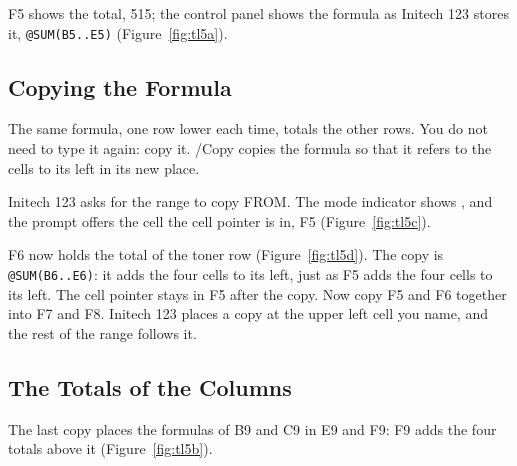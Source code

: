 \begin{Keystrokes}
\end{Keystrokes}
F5 shows the total, 515; the control panel shows the formula as Initech
123 stores it, \texttt{@SUM(B5..E5)} (Figure~\ref{fig:tl5a}).

\subsection{Copying the Formula}
The same formula, one row lower each time, totals the other rows.  You do
not need to type it again: copy it.  /Copy copies the formula so that it
refers to the cells to its left in its new place.

\begin{Keystrokes}
\end{Keystrokes}
Initech 123 asks for the range to copy FROM.  The mode indicator shows
, and the prompt offers the cell the cell pointer is in, F5
(Figure~\ref{fig:tl5c}).
\begin{Keystrokes}
\end{Keystrokes}
F6 now holds the total of the toner row (Figure~\ref{fig:tl5d}).  The
copy is \texttt{@SUM(B6..E6)}: it adds the four cells to its left, just as
F5 adds the four cells to its left.  The cell pointer stays in F5 after the
copy.
Now copy F5 and F6 together into F7 and F8.  Initech 123 places a copy at
the upper left cell you name, and the rest of the range follows it.

\begin{Keystrokes}
\end{Keystrokes}

\subsection{The Totals of the Columns}
\begin{Keystrokes}
\end{Keystrokes}
The last copy places the formulas of B9 and C9 in E9 and F9: F9 adds the
four totals above it (Figure~\ref{fig:tl5b}).

